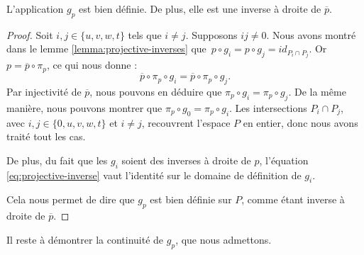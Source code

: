 \documentclass[hidelinks, 10pt]{article}
\begin{document}
\begin{lemma}\label{lemma:projective-inv-define}
L'application $g_p$ est bien définie. De plus, elle est une inverse à droite de $\overline{p}$.
\end{lemma}
\begin{proof}
Soit $i,j\in\{u,v,w,t\}$ tels que $i\neq j$. Supposons $ij\neq 0$. Nous avons montré dans le lemme \ref{lemma:projective-inverses} que~$p\circ g_i=p\circ g_j=id_{P_i\cap P_j}$. Or $p=\overline{p}\circ\pi_p$, ce qui nous donne : \begin{equation}\label{eq:projective-inverse}
\overline{p}\circ\pi_p\circ g_i=\overline{p}\circ\pi_p\circ g_j.
\end{equation}Par injectivité de $\overline{p}$, nous pouvons en déduire que $\pi_p\circ g_i=\pi_p\circ g_j$. De la même manière, nous pouvons montrer que $\pi_p\circ g_0=\pi_p\circ g_i$. Les intersections $P_i\cap P_j$, avec $i,j\in\{0,u,v,w,t\}$ et $i\neq j$, recouvrent l'espace $P$ en entier, donc nous avons traité tout les cas.

\bigskip De plus, du fait que les $g_i$ soient des inverses à droite de $p$, l'équation \eqref{eq:projective-inverse} vaut l'identité sur le domaine de définition de $g_i$.

Cela nous permet de dire que $g_p$ est bien définie sur $P$, comme étant inverse à droite de $\overline{p}$.
\end{proof}

Il reste à démontrer la continuité de $g_p$, que nous admettons.
\end{document}
